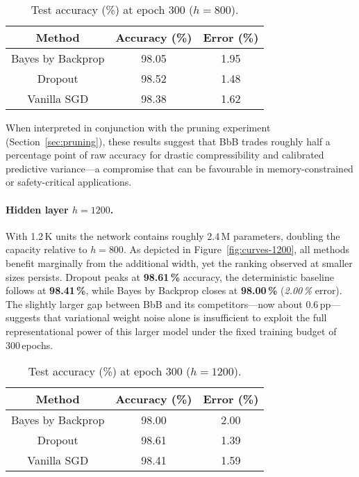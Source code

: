 \documentclass{article}
\begin{document}
\begin{table}[h]
\centering
\caption{Test accuracy (\%) at epoch 300 ($h=800$).}
\label{tab:acc-800}
\begin{tabular}{ccc}
\toprule
Method & Accuracy (\%) & Error (\%) \\
\midrule
Bayes by Backprop & 98.05 & 1.95 \\
Dropout           & 98.52 & 1.48 \\
Vanilla SGD       & 98.38 & 1.62 \\
\bottomrule
\end{tabular}
\end{table}

When interpreted in conjunction with the pruning experiment (Section~\ref{sec:pruning}), these results suggest that BbB trades roughly half a percentage point of raw accuracy for drastic compressibility and calibrated predictive variance—a compromise that can be favourable in memory-constrained or safety-critical applications.
\paragraph{Hidden layer $h=1200$.}
With 1.2\,K units the network contains roughly 2.4\,M parameters, doubling the capacity relative to $h=800$.  As depicted in Figure~\ref{fig:curves-1200}, all methods benefit marginally from the additional width, yet the ranking observed at smaller sizes persists.  Dropout peaks at \textbf{98.61\,\%} accuracy, the deterministic baseline follows at \textbf{98.41\,\%}, while Bayes by Backprop closes at \textbf{98.00\,\%} (\emph{2.00\,\%} error).  The slightly larger gap between BbB and its competitors—now about $0.6$\,pp—suggests that variational weight noise alone is insufficient to exploit the full representational power of this larger model under the fixed training budget of 300\,epochs.

\begin{table}[h]
\centering
\caption{Test accuracy (\%) at epoch 300 ($h=1200$).}
\label{tab:acc-1200}
\begin{tabular}{ccc}
\toprule
Method & Accuracy (\%) & Error (\%) \\
\midrule
Bayes by Backprop & 98.00 & 2.00 \\
Dropout           & 98.61 & 1.39 \\
Vanilla SGD       & 98.41 & 1.59 \\
\bottomrule
\end{tabular}
\end{table}
\end{document}
